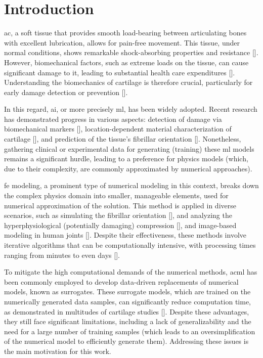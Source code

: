 \documentclass[12pt,a4paper]{report}
\begin{document}
\listoffigures{}
\newpage

\listoftables{}
\newpage

\chapter{Introduction}

\Ac{ac}, a soft tissue that provides smooth load-bearing between articulating bones with excellent lubrication, allows for pain-free movement. This tissue, under normal conditions, shows remarkable shock-absorbing properties and resistance [\cite{lu2008}]. However, biomechanical factors, such as extreme loads on the tissue, can cause significant damage to it, leading to substantial health care expenditures [\cite{salmon2016}]. Understanding the biomechanics of cartilage is therefore crucial, particularly for early damage detection or prevention [\cite{moreno2019}].

In this regard, \ac{ai}, or more precisely \ac{ml}, has been widely adopted. Recent research has demonstrated progress in various aspects: detection of damage via biomechanical markers [\cite{alunnicardinali2023}], location-dependent material characterization of cartilage [\cite{niasar2023}], and prediction of the tissue's fibrillar orientation [\cite{mirmojarabian2023}]. Nonetheless, gathering clinical or experimental data for generating (training) these \ac{ml} models remains a significant hurdle, leading to a preference for physics models (which, due to their complexity, are commonly approximated by numerical approaches).

\ac{fe} modeling, a prominent type of numerical modeling in this context, breaks down the complex physics domain into smaller, manageable elements, used for numerical approximation of the solution. This method is applied in diverse scenarios, such as simulating the fibrillar orientation [\cite{sajjadinia2021b}], and analyzing the hyperphysiological (potentially damaging) compression [\cite{occhetta2019}], and image-based modeling in human joints [\cite{thienkarochanakul2020}]. Despite their effectiveness, these methods involve iterative algorithms that can be computationally intensive, with processing times ranging from minutes to even days [\cite{donahue2002,kazemi2011,naghibi2016,wang2018b,lorza2021}].

To mitigate the high computational demands of the numerical methods, ac{ml} has been commonly employed to develop data-driven replacements of numerical models, known as surrogates. These surrogate models, which are trained on the numerically generated data samples, can significantly reduce computation time, as demonstrated in multitudes of cartilage studies [\cite{paiva2012,arbabi2016a,arbabi2016b,egli2021}]. Despite these advantages, they still face significant limitations, including a lack of generalizability and the need for a large number of training samples (which leads to an oversimplification of the numerical model to efficiently generate them). Addressing these issues is the main motivation for this work.
\end{document}
